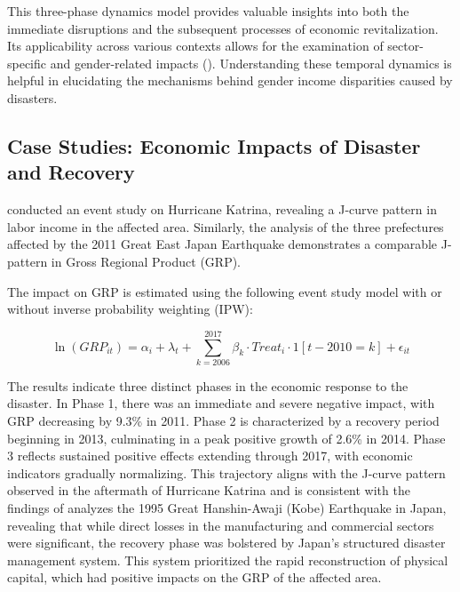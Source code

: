 \documentclass[a4paper,12pt]{article}
\begin{document}
This three-phase dynamics model provides valuable insights into both the immediate disruptions and the subsequent processes of economic revitalization. Its applicability across various contexts allows for the examination of sector-specific and gender-related impacts (\citet{Canessa2021WomensShocks}). Understanding these temporal dynamics is helpful in elucidating the mechanisms behind gender income disparities caused by disasters.


\subsection{Case Studies: Economic Impacts of Disaster and Recovery}

\citet{Deryugina2018TheReturns} conducted an event study on Hurricane Katrina, revealing a J-curve pattern in labor income in the affected area. Similarly, the analysis of the three prefectures affected by the 2011 Great East Japan Earthquake demonstrates a comparable J-pattern in Gross Regional Product (GRP).

The impact on GRP is estimated using the following event study model with or without inverse probability weighting (IPW):

\begin{equation}
\ln(GRP_{it}) = \alpha_i + \lambda_t + \sum_{k=2006}^{2017} \beta_k \cdot Treat_i \cdot 1[t-2010=k] + \epsilon_{it}
\end{equation}

The results indicate three distinct phases in the economic response to the disaster. In Phase 1, there was an immediate and severe negative impact, with GRP decreasing by 9.3\% in 2011. Phase 2 is characterized by a recovery period beginning in 2013, culminating in a peak positive growth of 2.6\% in 2014. Phase 3 reflects sustained positive effects extending through 2017, with economic indicators gradually normalizing. This trajectory aligns with the J-curve pattern observed in the aftermath of Hurricane Katrina and is consistent with the findings of \citet{Toyoda2008EconomicYears} analyzes the 1995 Great Hanshin-Awaji (Kobe) Earthquake in Japan, revealing that while direct losses in the manufacturing and commercial sectors were significant, the recovery phase was bolstered by Japan’s structured disaster management system. This system prioritized the rapid reconstruction of physical capital, which had positive impacts on the GRP of the affected area.
\end{document}
